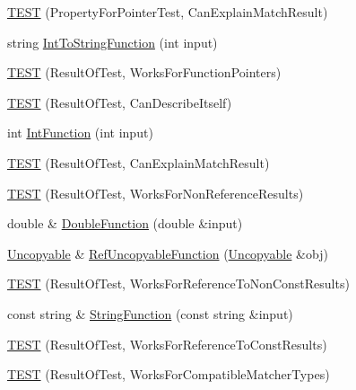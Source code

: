 \begin{DoxyCompactItemize}
\item 
\hyperlink{namespacetesting_1_1gmock__matchers__test_a1a7e2a9641a06e492d58c75d900330d3}{T\+E\+ST} (Property\+For\+Pointer\+Test, Can\+Explain\+Match\+Result)
\item 
string \hyperlink{namespacetesting_1_1gmock__matchers__test_a2399c4fae49f898c02f57a42047d80f2}{Int\+To\+String\+Function} (int input)
\item 
\hyperlink{namespacetesting_1_1gmock__matchers__test_a5aea17c7d3dd74cbc0cbf181b3a9e5f8}{T\+E\+ST} (Result\+Of\+Test, Works\+For\+Function\+Pointers)
\item 
\hyperlink{namespacetesting_1_1gmock__matchers__test_a1b5240d2272b679d7e3035554c2c5688}{T\+E\+ST} (Result\+Of\+Test, Can\+Describe\+Itself)
\item 
int \hyperlink{namespacetesting_1_1gmock__matchers__test_a6e957b9dcda1186c6274a8895d1514b5}{Int\+Function} (int input)
\item 
\hyperlink{namespacetesting_1_1gmock__matchers__test_ab7fe283b2955ca8bb11b2984a08eef33}{T\+E\+ST} (Result\+Of\+Test, Can\+Explain\+Match\+Result)
\item 
\hyperlink{namespacetesting_1_1gmock__matchers__test_a86f01e29ee48050d401fceca21d1041e}{T\+E\+ST} (Result\+Of\+Test, Works\+For\+Non\+Reference\+Results)
\item 
double \& \hyperlink{namespacetesting_1_1gmock__matchers__test_a48350ba4c1ce65694ec07e9c1c49a452}{Double\+Function} (double \&input)
\item 
\hyperlink{classtesting_1_1gmock__matchers__test_1_1Uncopyable}{Uncopyable} \& \hyperlink{namespacetesting_1_1gmock__matchers__test_aa6f7dd285163d5880cfd6685bec8cab4}{Ref\+Uncopyable\+Function} (\hyperlink{classtesting_1_1gmock__matchers__test_1_1Uncopyable}{Uncopyable} \&obj)
\item 
\hyperlink{namespacetesting_1_1gmock__matchers__test_a505e866c4066d27854cb6754c66a3eec}{T\+E\+ST} (Result\+Of\+Test, Works\+For\+Reference\+To\+Non\+Const\+Results)
\item 
const string \& \hyperlink{namespacetesting_1_1gmock__matchers__test_a5fdf1ecaf8e8e8ef5d57c311e675841d}{String\+Function} (const string \&input)
\item 
\hyperlink{namespacetesting_1_1gmock__matchers__test_a17b952cce22be6338fb1369f886d61c4}{T\+E\+ST} (Result\+Of\+Test, Works\+For\+Reference\+To\+Const\+Results)
\item 
\hyperlink{namespacetesting_1_1gmock__matchers__test_a1aceb307c843f0f5532053e390a7c654}{T\+E\+ST} (Result\+Of\+Test, Works\+For\+Compatible\+Matcher\+Types)

\end{DoxyCompactItemize}
